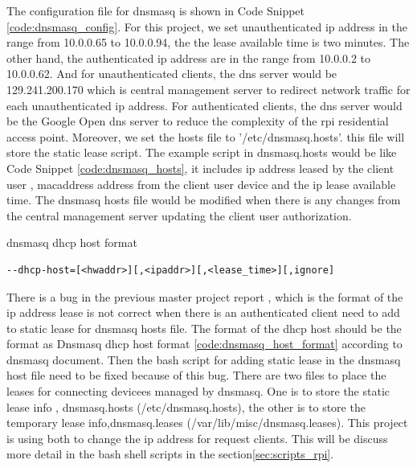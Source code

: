\par The configuration file for dnsmasq is shown in Code Snippet \ref{code:dnsmasq_config}. For this project, we set unauthenticated \gls{ip} address in the range from 10.0.0.65 to 10.0.0.94, the the lease available time is two minutes. The other hand, the authenticated \gls{ip} address are in the range from 10.0.0.2 to 10.0.0.62. And for unauthenticated clients, the \gls{dns} server would be 129.241.200.170 which is central management server to redirect network traffic for each unauthenticated \gls{ip} address. For authenticated clients, the \gls{dns} server would be the Google Open \gls{dns} server to reduce the complexity of the \gls{rpi} residential access point. Moreover, we set the hosts file to '/etc/dnsmasq.hosts'. this file will store the static lease script. The example script in dnsmasq.hosts would be like Code Snippet \ref{code:dnsmasq_hosts}, it includes \gls{ip} address leased by the client user , \gls{macaddress} address from the client user device and the \gls{ip} lease available time. The dnsmasq hosts file would be modified when there is any changes from the central management server updating the client user authorization. 
\begin{algorithm}[h]
  \caption{dnsmasq dhcp host format}
  \label{code:dnsmasq_host_format}
  \begin{verbatim}
--dhcp-host=[<hwaddr>][,<ipaddr>][,<lease_time>][,ignore]
 \end{verbatim}
\end{algorithm}
\par There is a bug in the previous master project report \cite{TorgeirMR}, which is the format of the \gls{ip} address lease is not correct when there is an authenticated client need to add to static lease for dnsmasq hosts file. The format of the dhcp host should be the format as Dnsmasq dhcp host format \ref{code:dnsmasq_host_format} according to dnsmasq document\cite{dnsmasq_doc}. Then the bash script for adding static lease in the dnsmasq host file need to be fixed because of this bug. There are two files to place the leases for connecting devicees managed by dnsmasq. One is to store the static lease info , dnsmasq.hosts (/etc/dnsmasq.hosts), the other is to store the temporary lease info,dnsmasq.leases (/var/lib/misc/dnsmasq.leases). This project is using both to change the \gls{ip} address for request clients. This will be discuss more detail in the bash shell scripts in the  section\ref{sec:scripts_rpi}.

